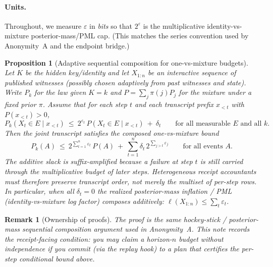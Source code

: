 \documentclass[11pt]{article}
\newtheorem{proposition}{Proposition}
\newtheorem{remark}{Remark}
\newcommand{\eps}{\varepsilon}
\begin{document}
\paragraph{Units.}
Throughout, we measure $\eps$ in \emph{bits} so that $2^{\eps}$ is the multiplicative identity-vs-mixture posterior-mass/PML cap.
(This matches the series convention used by Anonymity~A and the endpoint bridge.)\cite{series:oddsinflation}

\begin{proposition}[Adaptive sequential composition for one-vs-mixture budgets]\label{prop:adaptivecomp}
Let $K$ be the hidden key/identity and let $X_{1:n}$ be an interactive sequence of published witnesses (possibly chosen adaptively from past witnesses and state).
Write $P_k$ for the law given $K=k$ and $P=\sum_{j}\pi(j)P_j$ for the mixture under a fixed prior $\pi$.
Assume that for each step $t$ and each transcript prefix $x_{<t}$ with $P(x_{<t})>0$,
\[
P_k(X_t\in E\mid x_{<t})\ \le\ 2^{\eps_t}\,P(X_t\in E\mid x_{<t})\ +\ \delta_t
\qquad\text{for all measurable }E\text{ and all }k.
\]
Then the joint transcript satisfies the composed one-vs-mixture bound
\[
P_k(A)\ \le\ 2^{\sum_{t=1}^n\eps_t}\,P(A)\ +\ \sum_{t=1}^n \delta_t\,2^{\sum_{j>t}\eps_j}
\qquad\text{for all events }A.
\]
The additive slack is suffix-amplified because a failure at step $t$ is still carried through the multiplicative budget of later steps.  Heterogeneous receipt accountants must therefore preserve transcript order, not merely the multiset of per-step rows.
In particular, when all $\delta_t=0$ the realized posterior-mass inflation / PML (identity-vs-mixture log factor) composes additively: $\ell(X_{1:n})\le\sum_t\eps_t$.
\end{proposition}

\begin{remark}[Ownership of proofs]
The proof is the same hockey-stick / posterior-mass sequential composition argument used in Anonymity~A.\cite{series:oddsinflation}
This note records the \emph{receipt-facing condition}: you may claim a horizon-$n$ budget without independence if you commit (via the replay hook) to a plan that certifies the per-step conditional bound above.
\end{remark}
\end{document}
